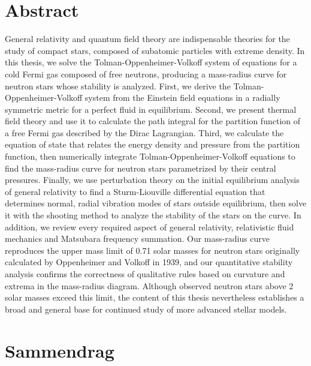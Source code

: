 \chapter*{Abstract}

General relativity and quantum field theory are indispensable theories for the study of compact stars, composed of subatomic particles with extreme density.
In this thesis, we solve the Tolman-Oppenheimer-Volkoff system of equations for a cold Fermi gas composed of free neutrons, producing a mass-radius curve for neutron stars whose stability is analyzed.
First, we derive the Tolman-Oppenheimer-Volkoff system from the Einstein field equations in a radially symmetric metric for a perfect fluid in equilibrium.
Second, we present thermal field theory and use it to calculate the path integral for the partition function of a free Fermi gas described by the Dirac Lagrangian.
Third, we calculate the equation of state that relates the energy density and pressure from the partition function, then numerically integrate Tolman-Oppenheimer-Volkoff equations to find the mass-radius curve for neutron stars parametrized by their central pressures.
Finally, we use perturbation theory on the initial equilibrium analysis of general relativity to find a Sturm-Liouville differential equation that determines normal, radial vibration modes of stars outside equilibrium, then solve it with the shooting method to analyze the stability of the stars on the curve.
In addition, we review every required aspect of general relativity, relativistic fluid mechanics and Matsubara frequency summation. 
Our mass-radius curve reproduces the upper mass limit of 0.71 solar masses for neutron stars originally calculated by Oppenheimer and Volkoff in 1939, and our quantitative stability analysis confirms the correctness of qualitative rules based on curvature and extrema in the mass-radius diagram.
Although observed neutron stars above 2 solar masses exceed this limit, the content of this thesis nevertheless establishes a broad and general base for continued study of more advanced stellar models.


\chapter*{Sammendrag}

